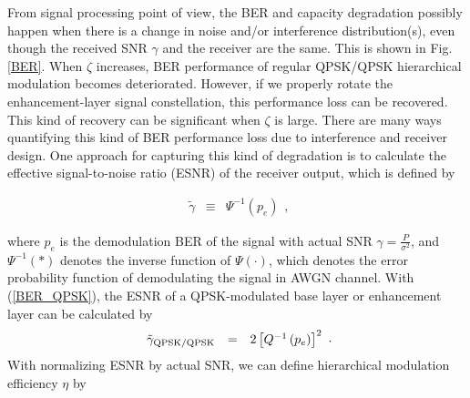 \documentclass[10pt,fleqn, twocolumn]{IEEEtran}
\begin{document}
\begin{figure}
\end{figure}

From signal processing point of view, the BER and capacity
degradation possibly happen when there is a change in noise and/or
interference distribution(s), even though the received SNR
$\gamma$ and the receiver are the same. This is shown in Fig.
\ref{BER}. When $\zeta$ increases, BER performance of regular
QPSK/QPSK hierarchical modulation becomes deteriorated. However,
if we properly rotate the enhancement-layer signal constellation,
this performance loss can be recovered. This kind of recovery can
be significant when $\zeta$ is large. There are many ways
quantifying this kind of BER performance loss due to interference
and receiver design. One approach for capturing this kind of
degradation is to calculate the effective signal-to-noise ratio
(ESNR) of the receiver output, which is defined by

\begin{equation}
\begin{array}{rcl}
\tilde{\gamma}&\equiv&\Psi^{-1}\left(p_{e}\right)
\end{array},\label{eff_SNR}
\end{equation}

\noindent where $p_{e}$ is the demodulation BER of the signal with
actual SNR $\gamma=\frac{P}{\sigma^2}$, and
$\Psi^{-1}\left(\ast\right)$ denotes the inverse function of
$\Psi\left(\cdot\right)$, which denotes the error probability
function of demodulating the signal in AWGN channel. With
(\ref{BER_QPSK}), the ESNR of a QPSK-modulated base layer or
enhancement layer can be calculated by
\begin{equation}
\begin{array}{rcl}
\tilde{\gamma}_{\rm
QPSK/QPSK}&=&2\left[Q^{-1}\left(p_{e}\right)\right]^2
\end{array}.\label{eff_SNR_QPSK}
\end{equation}
\noindent With normalizing ESNR by actual SNR, we can define
hierarchical modulation efficiency $\eta$ by
\end{document}
